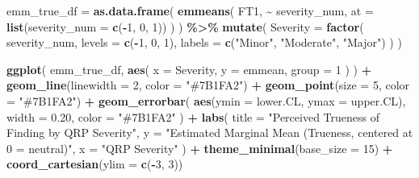 \documentclass[
]{article}
\newenvironment{Shaded}{\begin{snugshade}}{\end{snugshade}}
\newcommand{\AttributeTok}[1]{\textcolor[rgb]{0.13,0.29,0.53}{#1}}
\newcommand{\DecValTok}[1]{\textcolor[rgb]{0.00,0.00,0.81}{#1}}
\newcommand{\FloatTok}[1]{\textcolor[rgb]{0.00,0.00,0.81}{#1}}
\newcommand{\FunctionTok}[1]{\textcolor[rgb]{0.13,0.29,0.53}{\textbf{#1}}}
\newcommand{\NormalTok}[1]{#1}
\newcommand{\OtherTok}[1]{\textcolor[rgb]{0.56,0.35,0.01}{#1}}
\newcommand{\SpecialCharTok}[1]{\textcolor[rgb]{0.81,0.36,0.00}{\textbf{#1}}}
\newcommand{\StringTok}[1]{\textcolor[rgb]{0.31,0.60,0.02}{#1}}
\begin{document}
\begin{Shaded}
\begin{Highlighting}[]
\NormalTok{emm\_true\_df }\OtherTok{=} \FunctionTok{as.data.frame}\NormalTok{(}
  \FunctionTok{emmeans}\NormalTok{(}
\NormalTok{    FT1,}
    \SpecialCharTok{\textasciitilde{}}\NormalTok{ severity\_num,}
    \AttributeTok{at =} \FunctionTok{list}\NormalTok{(}\AttributeTok{severity\_num =} \FunctionTok{c}\NormalTok{(}\SpecialCharTok{{-}}\DecValTok{1}\NormalTok{, }\DecValTok{0}\NormalTok{, }\DecValTok{1}\NormalTok{))}
\NormalTok{  )}
\NormalTok{) }\SpecialCharTok{\%\textgreater{}\%}
  \FunctionTok{mutate}\NormalTok{(}
    \AttributeTok{Severity =} \FunctionTok{factor}\NormalTok{(}
\NormalTok{      severity\_num,}
      \AttributeTok{levels =} \FunctionTok{c}\NormalTok{(}\SpecialCharTok{{-}}\DecValTok{1}\NormalTok{, }\DecValTok{0}\NormalTok{, }\DecValTok{1}\NormalTok{),}
      \AttributeTok{labels =} \FunctionTok{c}\NormalTok{(}\StringTok{"Minor"}\NormalTok{, }\StringTok{"Moderate"}\NormalTok{, }\StringTok{"Major"}\NormalTok{)}
\NormalTok{    )}
\NormalTok{  )}

\FunctionTok{ggplot}\NormalTok{(}
\NormalTok{  emm\_true\_df,}
  \FunctionTok{aes}\NormalTok{(}
    \AttributeTok{x =}\NormalTok{ Severity,}
    \AttributeTok{y =}\NormalTok{ emmean,}
    \AttributeTok{group =} \DecValTok{1}
\NormalTok{  )}
\NormalTok{) }\SpecialCharTok{+}
  \FunctionTok{geom\_line}\NormalTok{(}\AttributeTok{linewidth =} \DecValTok{2}\NormalTok{, }\AttributeTok{color =} \StringTok{"\#7B1FA2"}\NormalTok{) }\SpecialCharTok{+}
  \FunctionTok{geom\_point}\NormalTok{(}\AttributeTok{size =} \DecValTok{5}\NormalTok{, }\AttributeTok{color =} \StringTok{"\#7B1FA2"}\NormalTok{) }\SpecialCharTok{+}
  \FunctionTok{geom\_errorbar}\NormalTok{(}
    \FunctionTok{aes}\NormalTok{(}\AttributeTok{ymin =}\NormalTok{ lower.CL, }\AttributeTok{ymax =}\NormalTok{ upper.CL),}
    \AttributeTok{width =} \FloatTok{0.20}\NormalTok{,}
    \AttributeTok{color =} \StringTok{"\#7B1FA2"}
\NormalTok{  ) }\SpecialCharTok{+}
  \FunctionTok{labs}\NormalTok{(}
    \AttributeTok{title =} \StringTok{"Perceived Trueness of Finding by QRP Severity"}\NormalTok{,}
    \AttributeTok{y =} \StringTok{"Estimated Marginal Mean (Trueness, centered at 0 = neutral)"}\NormalTok{,}
    \AttributeTok{x =} \StringTok{"QRP Severity"}
\NormalTok{  ) }\SpecialCharTok{+}
  \FunctionTok{theme\_minimal}\NormalTok{(}\AttributeTok{base\_size =} \DecValTok{15}\NormalTok{) }\SpecialCharTok{+}
  \FunctionTok{coord\_cartesian}\NormalTok{(}\AttributeTok{ylim =} \FunctionTok{c}\NormalTok{(}\SpecialCharTok{{-}}\DecValTok{3}\NormalTok{, }\DecValTok{3}\NormalTok{))}
\end{Highlighting}
\end{Shaded}
\end{document}
